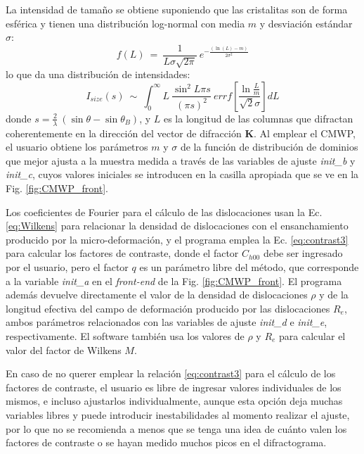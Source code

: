 La intensidad de tamaño se obtiene suponiendo que las cristalitas son de forma esférica y tienen una distribución log-normal con media $m$ y desviación estándar $\sigma$:
\begin{equation}
  f(L) \ = \ \frac{1}{L \sigma \sqrt{2 \pi}} \ e^{-\frac{(\ln(L)-m)}{2 \sigma^2}}
  \label{eq:lognormal}
\end{equation}
\noindent
lo que da una distribución de intensidades\cite{Ribarik2008}:
\begin{equation}
  I_{size}(s) \ \sim \ \int_0^{\infty} L \ \frac{\sin^2{L \pi s}}{(\pi s)^2} \ errf \left[ \frac{\ln{\frac{L}{m}}}{\sqrt{2}\sigma} \right] dL
  \label{eq:Isize}
\end{equation}
\noindent
donde $s = \frac{2}{\lambda} \ (\sin \theta - \sin \theta_B)$, y $L$ es la longitud de las columnas que difractan coherentemente en la dirección del vector de difracción $\mathbf{K}$.
Al emplear el CMWP, el usuario obtiene los parámetros $m$ y $\sigma$ de la función de distribución de dominios que mejor ajusta a la muestra medida a través de las variables de ajuste \textit{init\_b} y \textit{init\_c}, cuyos valores iniciales se introducen en la casilla apropiada que se ve en la Fig. \ref{fig:CMWP_front}.

Los coeficientes de Fourier para el cálculo de las dislocaciones usan la Ec. \ref{eq:Wilkens} para relacionar la densidad de dislocaciones con el ensanchamiento producido por la micro-deformación, y el programa emplea la Ec. \ref{eq:contrast3} para calcular los factores de contraste, donde el factor $C_{h00}$ debe ser ingresado por el usuario, pero el factor $q$ es un parámetro libre del método, que corresponde a la variable \textit{init\_a} en el \textit{front-end} de la Fig. \ref{fig:CMWP_front}.
El programa además devuelve directamente el valor de la densidad de dislocaciones $\rho$ y de la longitud efectiva del campo de deformación producido por las dislocaciones $R_e$, ambos parámetros relacionados con las variables de ajuste \textit{init\_d} e \textit{init\_e}, respectivamente. 
El software también usa los valores de $\rho$ y $R_e$ para calcular el valor del factor de Wilkens $M$.

En caso de no querer emplear la relación \ref{eq:contrast3} para el cálculo de los factores de contraste, el usuario es libre de ingresar valores individuales de los mismos, e incluso ajustarlos individualmente, aunque esta opción deja muchas variables libres y puede introducir inestabilidades al momento realizar el ajuste, por lo que no se recomienda a menos que se tenga una idea de cuánto valen los factores de contraste o se hayan medido muchos picos en el difractograma.

